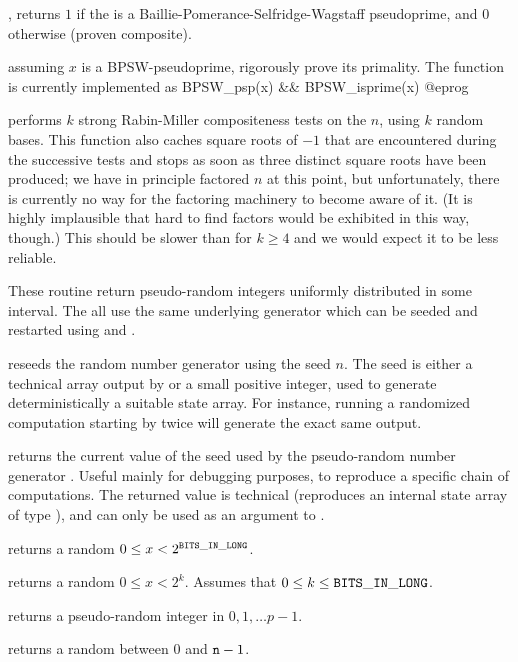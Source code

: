 , returns $1$ if the   is a
Baillie-Pomerance-Selfridge-Wagstaff pseudoprime, and $0$ otherwise (proven
composite).

 assuming $x$ is a BPSW-pseudoprime, rigorously
prove its primality. The function  is currently implemented
as
\bprog
 BPSW_psp(x) && BPSW_isprime(x)
@eprog

 performs $k$ strong Rabin-Miller
compositeness tests on the  $n$, using $k$ random bases. This
function also caches square roots of $-1$ that are encountered during the
successive tests and stops as soon as three distinct square roots have been
produced; we have in principle factored $n$ at this point, but
unfortunately, there is currently no way for the factoring machinery to
become aware of it. (It is highly implausible that hard to find factors
would be exhibited in this way, though.) This should be slower than
 for $k\geq 4$ and we would expect it to be less reliable.

These routine return pseudo-random integers uniformly distributed in some
interval. The all use the same underlying generator which can be seeded and
restarted using  and .

 reseeds the random number generator using the
seed $n$. The seed is either a technical array output by 
or a small positive integer, used to generate deterministically a suitable
state array. For instance, running a randomized computation starting by
 twice will generate the exact same output.

 returns the current value of the seed used by the
pseudo-random number generator . Useful mainly for debugging
purposes, to reproduce a specific chain of computations. The returned value
is technical (reproduces an internal state array of type ),
and can only be used as an argument to .

 returns a random $0 \leq x < 2^{\tt BITS\_IN\_LONG}$.

 returns a random $0 \leq x < 2^k$. Assumes
that $0 \leq k \leq {\tt BITS\_IN\_LONG}$.

 returns a pseudo-random integer
in $0, 1, \dots p-1$.

 returns a random  between $0$ and ${\tt n}
- 1$.

